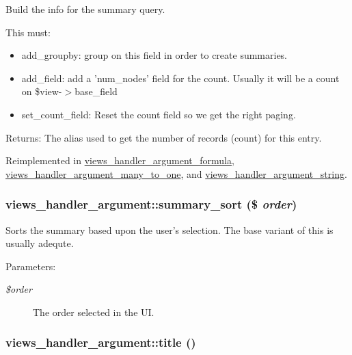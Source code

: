 Build the info for the summary query.

This must:\begin{itemize}
\item add\_\-groupby: group on this field in order to create summaries.\item add\_\-field: add a 'num\_\-nodes' field for the count. Usually it will be a count on \$view-$>$base\_\-field\item set\_\-count\_\-field: Reset the count field so we get the right paging.\end{itemize}


\begin{Desc}
\item[Returns:]The alias used to get the number of records (count) for this entry. \end{Desc}


Reimplemented in \hyperlink{classviews__handler__argument__formula_377fd11d178f88a0bd68c2ec9d6f9e00}{views\_\-handler\_\-argument\_\-formula}, \hyperlink{classviews__handler__argument__many__to__one_320b34f2327cb15467353d2534d71ddd}{views\_\-handler\_\-argument\_\-many\_\-to\_\-one}, and \hyperlink{classviews__handler__argument__string_829ad5356d65f02a75af5d1e8374292b}{views\_\-handler\_\-argument\_\-string}.\hypertarget{classviews__handler__argument_73f6612542a3ed5a977004f3628bce24}{
\subsubsection[{summary\_\-sort}]{\setlength{\rightskip}{0pt plus 5cm}views\_\-handler\_\-argument::summary\_\-sort (\$ {\em order})}}
\label{classviews__handler__argument_73f6612542a3ed5a977004f3628bce24}


Sorts the summary based upon the user's selection. The base variant of this is usually adequte.

\begin{Desc}
\item[Parameters:]
\begin{description}
\item[{\em \$order}]The order selected in the UI. \end{description}
\end{Desc}
\hypertarget{classviews__handler__argument_76181ac24e7be4a09aaafc1fa5f15ea1}{
\subsubsection[{title}]{\setlength{\rightskip}{0pt plus 5cm}views\_\-handler\_\-argument::title ()}}
\label{classviews__handler__argument_76181ac24e7be4a09aaafc1fa5f15ea1}


